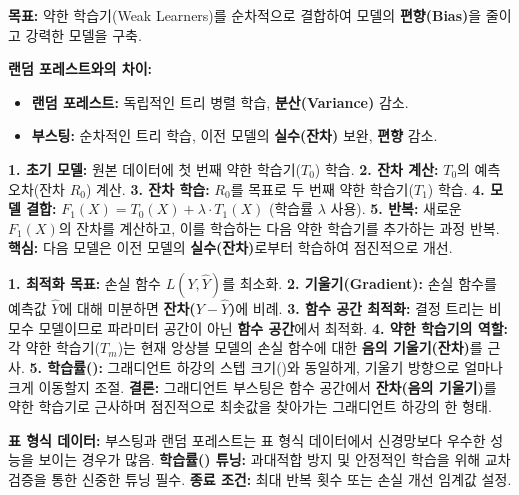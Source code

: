 \documentclass[11pt,a4paper]{article}
\theoremstyle{definition}
\begin{document}
\begin{tcolorbox}[summary, title=\textbf{부스팅 핵심 요약}] %
\textbf{목표:} 약한 학습기(Weak Learners)를 순차적으로 결합하여 모델의 \textbf{편향(Bias)}을 줄이고 강력한 모델을 구축.

\textbf{랜덤 포레스트와의 차이:}
\begin{itemize}
    \item \textbf{랜덤 포레스트:} 독립적인 트리 병렬 학습, \textbf{분산(Variance)} 감소.
    \item \textbf{부스팅:} 순차적인 트리 학습, 이전 모델의 \textbf{실수(잔차)} 보완, \textbf{편향} 감소.
\end{itemize}
\end{tcolorbox}

\begin{tcolorbox}[infobox, title=\textbf{그래디언트 부스팅 작동 원리}] %
\textbf{1. 초기 모델:} 원본 데이터에 첫 번째 약한 학습기($T_0$) 학습.
\textbf{2. 잔차 계산:} $T_0$의 예측 오차(잔차 $R_0$) 계산.
\textbf{3. 잔차 학습:} $R_0$를 목표로 두 번째 약한 학습기($T_1$) 학습.
\textbf{4. 모델 결합:} $F_1(X) = T_0(X) + \lambda \cdot T_1(X)$ (학습률 $\lambda$ 사용).
\textbf{5. 반복:} 새로운 $F_1(X)$의 잔차를 계산하고, 이를 학습하는 다음 약한 학습기를 추가하는 과정 반복.
\textbf{핵심:} 다음 모델은 이전 모델의 \textbf{실수(잔차)}로부터 학습하여 점진적으로 개선.
\end{tcolorbox}

\begin{tcolorbox}[warningbox, title=\textbf{그래디언트 하강(Gradient Descent)과의 연결}] %
\textbf{1. 최적화 목표:} 손실 함수 $L(Y, \hat{Y})$를 최소화.
\textbf{2. 기울기(Gradient):} 손실 함수를 예측값 $\hat{Y}$에 대해 미분하면 \textbf{잔차($Y - \hat{Y}$)}에 비례.
\textbf{3. 함수 공간 최적화:} 결정 트리는 비모수 모델이므로 파라미터 공간이 아닌 \textbf{함수 공간}에서 최적화.
\textbf{4. 약한 학습기의 역할:} 각 약한 학습기($T_m$)는 현재 앙상블 모델의 손실 함수에 대한 \textbf{음의 기울기(잔차)}를 근사.
\textbf{5. 학습률(\texttt{\lambda}):} 그래디언트 하강의 스텝 크기(\texttt{\eta})와 동일하게, 기울기 방향으로 얼마나 크게 이동할지 조절.
\textbf{결론:} 그래디언트 부스팅은 함수 공간에서 \textbf{잔차(음의 기울기)}를 약한 학습기로 근사하며 점진적으로 최솟값을 찾아가는 그래디언트 하강의 한 형태.
\end{tcolorbox}

\begin{tcolorbox}[importantbox, title=\textbf{중요 사항}] %
\textbf{표 형식 데이터:} 부스팅과 랜덤 포레스트는 표 형식 데이터에서 신경망보다 우수한 성능을 보이는 경우가 많음.
\textbf{학습률(\texttt{\lambda}) 튜닝:} 과대적합 방지 및 안정적인 학습을 위해 교차 검증을 통한 신중한 튜닝 필수.
\textbf{종료 조건:} 최대 반복 횟수 또는 손실 개선 임계값 설정.
\end{tcolorbox}
\end{document}
